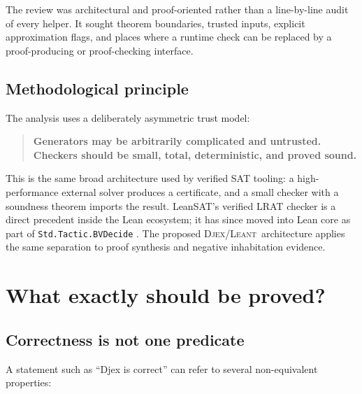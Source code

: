 \documentclass[11pt,letterpaper,openany]{report}
\theoremstyle{definition}
\theoremstyle{remark}
\newcommand{\Djex}{\textsc{Djex}}
\newcommand{\Leant}{\textsc{Leant}}
\newcommand{\code}[1]{\texttt{#1}}
\begin{document}
The review was architectural and proof-oriented rather than a line-by-line audit of every helper. It sought theorem boundaries, trusted inputs, explicit approximation flags, and places where a runtime check can be replaced by a proof-producing or proof-checking interface.

\section{Methodological principle}

The analysis uses a deliberately asymmetric trust model:

\begin{quote}
\textbf{Generators may be arbitrarily complicated and untrusted. Checkers should be small, total, deterministic, and proved sound.}
\end{quote}

This is the same broad architecture used by verified SAT tooling: a high-performance external solver produces a certificate, and a small checker with a soundness theorem imports the result. LeanSAT's verified LRAT checker is a direct precedent inside the Lean ecosystem; it has since moved into Lean core as part of \code{Std.Tactic.BVDecide} \cite{leansat}. The proposed \Djex/\Leant\ architecture applies the same separation to proof synthesis and negative inhabitation evidence.

\chapter{What exactly should be proved?}
\label{ch:claims}

\section{Correctness is not one predicate}

A statement such as ``Djex is correct'' can refer to several non-equivalent properties:
\end{document}
